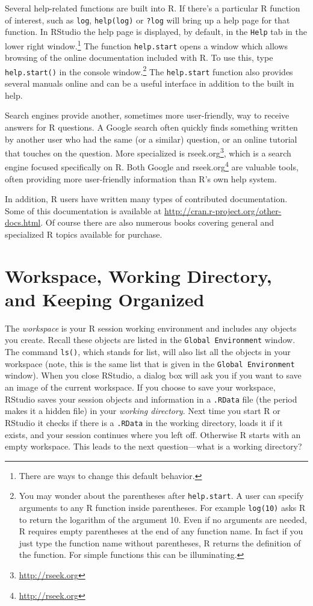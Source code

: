 \documentclass[]{krantz}
\renewcommand{\href}[2]{#2\footnote{\url{#1}}}
\begin{document}
Several help-related functions are built into R. If there's a particular
R function of interest, such as \texttt{log}, \texttt{help(log)} or
\texttt{?log} will bring up a help page for that function. In RStudio
the help page is displayed, by default, in the \texttt{Help} tab in the
lower right window.\footnote{There are ways to change this default
  behavior.} The function \texttt{help.start} opens a window which
allows browsing of the online documentation included with R. To use
this, type \texttt{help.start()} in the console window.\footnote{You may
  wonder about the parentheses after \texttt{help.start}. A user can
  specify arguments to any R function inside parentheses. For example
  \texttt{log(10)} asks R to return the logarithm of the argument 10.
  Even if no arguments are needed, R requires empty parentheses at the
  end of any function name. In fact if you just type the function name
  without parentheses, R returns the definition of the function. For
  simple functions this can be illuminating.} The \texttt{help.start}
function also provides several manuals online and can be a useful
interface in addition to the built in help.

Search engines provide another, sometimes more user-friendly, way to
receive answers for R questions. A Google search often quickly finds
something written by another user who had the same (or a similar)
question, or an online tutorial that touches on the question. More
specialized is \href{http://rseek.org}{rseek.org}, which is a search
engine focused specifically on R. Both Google and
\href{http://rseek.org}{rseek.org} are valuable tools, often providing
more user-friendly information than R's own help system.

In addition, R users have written many types of contributed
documentation. Some of this documentation is available at
\url{http://cran.r-project.org/other-docs.html}. Of course there are
also numerous books covering general and specialized R topics available
for purchase.

\section{Workspace, Working Directory, and Keeping
Organized}\label{workspace-working-directory-and-keeping-organized}

The \emph{workspace} is your R session working environment and includes
any objects you create. Recall these objects are listed in the
\texttt{Global\ Environment} window. The command \texttt{ls()}, which
stands for list, will also list all the objects in your workspace (note,
this is the same list that is given in the \texttt{Global\ Environment}
window). When you close RStudio, a dialog box will ask you if you want
to save an image of the current workspace. If you choose to save your
workspace, RStudio saves your session objects and information in a
\texttt{.RData} file (the period makes it a hidden file) in your
\emph{working directory}. Next time you start R or RStudio it checks if
there is a \texttt{.RData} in the working directory, loads it if it
exists, and your session continues where you left off. Otherwise R
starts with an empty workspace. This leads to the next question---what
is a working directory?
\end{document}
